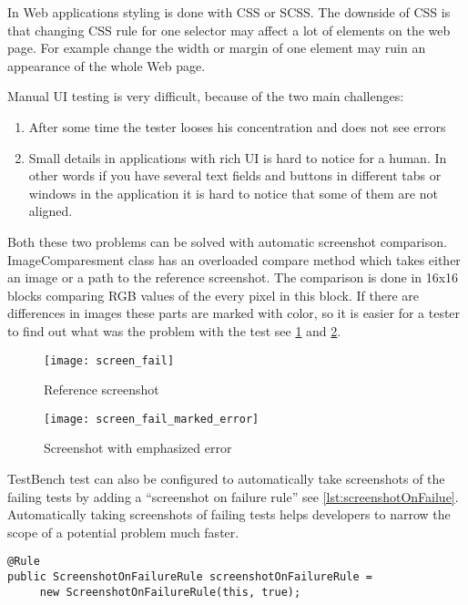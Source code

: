 In Web applications styling is done with CSS or SCSS. The downside of CSS 
is that changing CSS rule for one selector may affect a lot of elements on the
web page. For example change the width or margin of one element may ruin an
appearance of the whole Web page.

Manual UI testing is very difficult, because of the two main challenges:
\begin{enumerate}
  \item After some time the tester looses his concentration and does not see
  errors
  \item Small details in applications with rich UI is hard to notice for a
  human. In other words if you have several text fields and buttons in different
  tabs or windows in the application it is hard to notice that some of them are
  not aligned.
\end{enumerate}

Both these two problems can be solved with automatic screenshot comparison.
ImageComparesment class has an overloaded compare method which takes either an
image or a path to the reference screenshot. The comparison is done in 16x16
blocks comparing RGB values of the every pixel in this block. If there are
differences in images these parts are marked with color, so it is easier for a
tester to find out what was the problem with the test see
\ref{fig:failedscreen} and \ref{fig:failedscreenmarked}.

	\begin{figure}
	\centering
	\texttt{[image: screen\_fail]}
	\caption{Reference screenshot}
	\label{fig:failedscreen}
	\end{figure}

	\begin{figure}
	\centering
	\texttt{[image: screen\_fail\_marked\_error]}
	\caption{Screenshot with emphasized error}
	\label{fig:failedscreenmarked}
	\end{figure}

TestBench test can also be configured to automatically take screenshots of the failing tests by adding
a ``screenshot on failure rule'' see \ref{lst:screenshotOnFailue}. Automatically
taking screenshots of failing tests helps developers to narrow the
scope of a potential problem much faster.

\lstset{style=a1listing}
  	\begin{lstlisting}[caption=Adding screenshot on failure	rule,label={lst:screenshotOnFailue}]
@Rule
public ScreenshotOnFailureRule screenshotOnFailureRule =
	 new ScreenshotOnFailureRule(this, true);
	\end{lstlisting}

